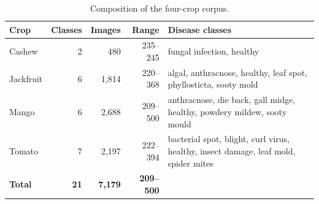 \begin{table}[H]
\caption{Composition of the four-crop corpus.\label{tab:dataset}}
\small
\setlength{\tabcolsep}{3pt}
\begin{tabularx}{\textwidth}{@{}l r r r L@{}}
\toprule
\textbf{Crop} & \textbf{Classes} & \textbf{Images} & \textbf{Range} & \textbf{Disease classes} \\
\midrule
Cashew & 2 & 480 & 235--245 & \scriptsize fungal infection, healthy \\
Jackfruit & 6 & 1{,}814 & 220--368 & \scriptsize algal, anthracnose, healthy, leaf spot, phyllosticta, sooty mold \\
Mango & 6 & 2{,}688 & 209--500 & \scriptsize anthracnose, die back, gall midge, healthy, powdery mildew, sooty mould \\
Tomato & 7 & 2{,}197 & 222--394 & \scriptsize bacterial spot, blight, curl virus, healthy, insect damage, leaf mold, spider mites \\
\midrule
\textbf{Total} & \textbf{21} & \textbf{7{,}179} & \textbf{209--500} &  \\
\bottomrule
\end{tabularx}
\end{table}
